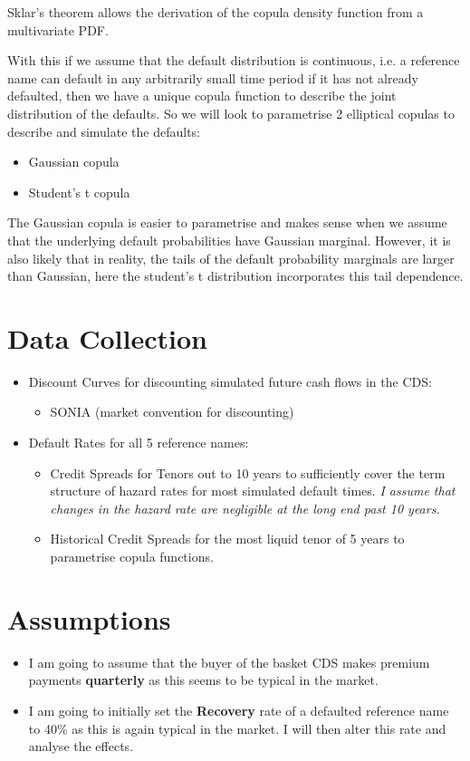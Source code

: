 \documentclass{report}
\theoremstyle{plain}
\theoremstyle{definition}
\begin{document}
Sklar's theorem allows the derivation of the copula density function from a multivariate PDF.

With this if we assume that the default distribution is continuous, i.e. a reference name can default in any arbitrarily small time period if it has not already defaulted, then we have a unique copula function to describe the joint distribution of the defaults. So we will look to parametrise 2 elliptical copulas to describe and simulate the defaults: 
\begin{itemize}
	\item Gaussian copula
	\item Student's t copula
\end{itemize}

The Gaussian copula is easier to parametrise and makes sense when we assume that the underlying default probabilities have Gaussian marginal. However, it is also likely that in reality, the tails of the default probability marginals are larger than Gaussian, here the student's t distribution incorporates this tail dependence.

\section{Data Collection}

\begin{itemize}
	\item Discount Curves for discounting simulated future cash flows in the CDS:
	\begin{itemize}
		\item SONIA (market convention for discounting)
	\end{itemize}
	\item Default Rates for all 5 reference names:
	\begin{itemize}
		\item Credit Spreads for Tenors out to 10 years to sufficiently cover the term structure of hazard rates for most simulated default times. \textit{I assume that changes in the hazard rate are negligible at the long end past 10 years.}
		\item Historical Credit Spreads for the most liquid tenor of 5 years to parametrise copula functions. 
	\end{itemize}	
\end{itemize}

\section{Assumptions}
\begin{itemize}
	\item I am going to assume that the buyer of the basket CDS makes premium payments \textbf{quarterly} as this seems to be typical in the market.
	\item I am going to initially set the \textbf{Recovery} rate of a defaulted reference name to 40\% as this is again typical in the market. I will then alter this rate and analyse the effects.
\end{itemize}
\end{document}
